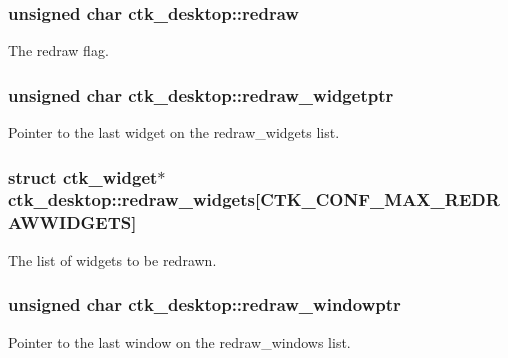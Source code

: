 \subsubsection[{redraw}]{\setlength{\rightskip}{0pt plus 5cm}unsigned char ctk\+\_\+desktop\+::redraw}\label{structctk__desktop_a51920c8b038bc60c96837d0120bf6cb9}
The redraw flag. \hypertarget{structctk__desktop_aaf90f191111d9b0ff3f8a10d4563964c}{}
\subsubsection[{redraw\+\_\+widgetptr}]{\setlength{\rightskip}{0pt plus 5cm}unsigned char ctk\+\_\+desktop\+::redraw\+\_\+widgetptr}\label{structctk__desktop_aaf90f191111d9b0ff3f8a10d4563964c}
Pointer to the last widget on the redraw\+\_\+widgets list. \hypertarget{structctk__desktop_add627f6c546946087f9a9b16c691b8dc}{}
\subsubsection[{redraw\+\_\+widgets}]{\setlength{\rightskip}{0pt plus 5cm}struct {\bf ctk\+\_\+widget}$\ast$ ctk\+\_\+desktop\+::redraw\+\_\+widgets\mbox{[}C\+T\+K\+\_\+\+C\+O\+N\+F\+\_\+\+M\+A\+X\+\_\+\+R\+E\+D\+R\+A\+W\+W\+I\+D\+G\+E\+T\+S\mbox{]}}\label{structctk__desktop_add627f6c546946087f9a9b16c691b8dc}
The list of widgets to be redrawn. \hypertarget{structctk__desktop_a893796b824512c19839b54c28c035cb8}{}
\subsubsection[{redraw\+\_\+windowptr}]{\setlength{\rightskip}{0pt plus 5cm}unsigned char ctk\+\_\+desktop\+::redraw\+\_\+windowptr}\label{structctk__desktop_a893796b824512c19839b54c28c035cb8}
Pointer to the last window on the redraw\+\_\+windows list. \hypertarget{structctk__desktop_a5d1ee2fbc501fb71c7690b91493b46c1}{}

